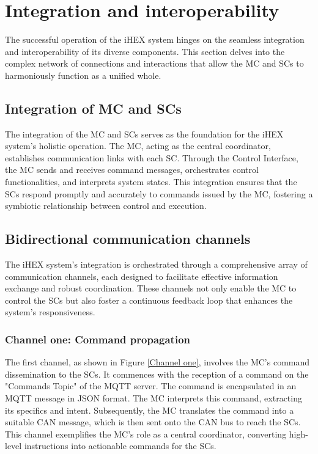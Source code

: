 \section{Integration and interoperability}

The successful operation of the iHEX system hinges on the seamless integration and interoperability of its diverse components. This section delves into the complex network of connections and interactions that allow the MC and SCs to harmoniously function as a unified whole.

\subsection{Integration of MC and SCs}

The integration of the MC and SCs serves as the foundation for the iHEX system's holistic operation. The MC, acting as the central coordinator, establishes communication links with each SC. Through the Control Interface, the MC sends and receives command messages, orchestrates control functionalities, and interprets system states. This integration ensures that the SCs respond promptly and accurately to commands issued by the MC, fostering a symbiotic relationship between control and execution.

\subsection{Bidirectional communication channels}
The iHEX system's integration is orchestrated through a comprehensive array of communication channels, each designed to facilitate effective information exchange and robust coordination. These channels not only enable the MC to control the SCs but also foster a continuous feedback loop that enhances the system's responsiveness.

\subsubsection{Channel one: Command propagation}
The first channel, as shown in Figure \ref{Channel one}, involves the MC's command dissemination to the SCs. It commences with the reception of a command on the "Commands Topic" of the MQTT server. The command is encapsulated in an MQTT message in JSON format. The MC interprets this command, extracting its specifics and intent. Subsequently, the MC translates the command into a suitable CAN message, which is then sent onto the CAN bus to reach the SCs. This channel exemplifies the MC's role as a central coordinator, converting high-level instructions into actionable commands for the SCs.

